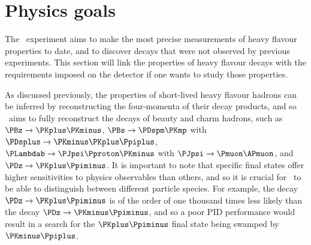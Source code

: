 \section{Physics goals}
\label{chap:intro:lhcb:physics}



The \lhcb\ experiment aims to make the most precise measurements of heavy 
flavour properties to date, and to discover decays that were not observed by 
previous experiments.
This section will link the properties of heavy flavour decays with the 
requirements imposed on the detector if one wants to study those properties.

As discussed previously, the properties of short-lived heavy flavour hadrons 
can be inferred by reconstructing the four-momenta of their decay products, and 
so \lhcb\ aims to fully reconstruct the decays of beauty and charm hadrons, 
such as $\decay{\PBz}{\PKplus\PKminus}$, $\decay{\PBs}{\PDspm\PKmp}$ with 
$\decay{\PDsplus}{\PKminus\PKplus\Ppiplus}$, 
$\decay{\PLambdab}{\PJpsi\Pproton\PKminus}$ with 
$\decay{\PJpsi}{\Pmuon\APmuon}$, and $\decay{\PDz}{\PKplus\Ppiminus}$.
It is important to note that specific final states offer higher sensitivities 
to physics observables than others, and so it is crucial for \lhcb\ to be able 
to distinguish between different particle species.
For example, the decay $\decay{\PDz}{\PKplus\Ppiminus}$ is of the order of one 
thousand times less likely than the decay $\decay{\PDz}{\PKminus\Ppiminus}$, 
and so a poor \ac{PID} performance would result in a search for the 
$\PKplus\Ppiminus$ final state being swamped by $\PKminus\Ppiplus$.

